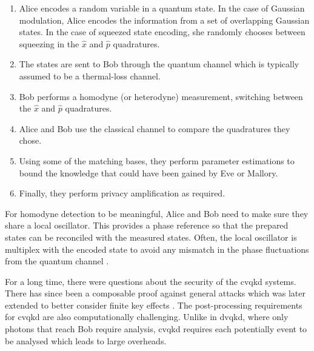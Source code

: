 \begin{algorithm}
\begin{enumerate}
	\item Alice encodes a random variable in a quantum state. In the case of Gaussian modulation, Alice encodes the information from a set of overlapping Gaussian states. In the case of squeezed state encoding, she randomly chooses between squeezing in the $\hat{x}$ and $\hat{p}$ quadratures.
	\item The states are sent to Bob through the quantum channel which is typically assumed to be a thermal-loss channel.
	\item Bob performs a homodyne (or heterodyne) measurement, switching between the $\hat{x}$ and $\hat{p}$ quadratures.
	\item Alice and Bob use the classical channel to compare the quadratures they chose.
	\item Using some of the matching bases, they perform parameter estimations to bound the knowledge that could have been gained by Eve or Mallory.
	\item Finally, they perform privacy amplification as required.
\end{enumerate}
\end{algorithm}





For homodyne detection to be meaningful, Alice and Bob need to make sure they share a local oscillator. This provides a phase reference so that the prepared states can be reconciled with the measured states. Often, the local oscillator is multiplex with the encoded state to avoid any mismatch in the phase fluctuations from the quantum channel \cite{jouguet2013experimental}.

For a long time, there were questions about the security of the \ac{cvqkd} systems. There has since been a composable proof against general attacks \cite{Leverrier2015Composable} which was later extended to better consider finite key effects \cite{Leverrier2017Secrity}. The post-processing requirements for \ac{cvqkd} are also computationally challenging. Unlike in \ac{dvqkd}, where only photons that reach Bob require analysis, \ac{cvqkd} requires each potentially event to be analysed which leads to large overheads.

